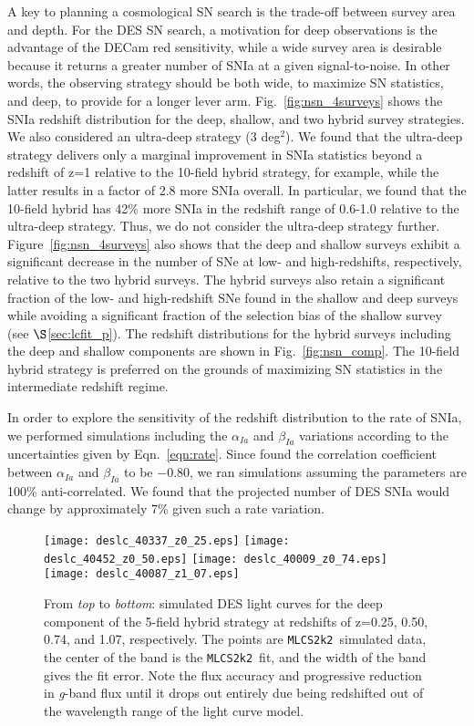 \documentclass[preprint2]{aastex}    %
\newcommand{\mlcs}{{\tt MLCS2k2}}
\begin{document}
A key to %
planning a cosmological SN search is the trade-off between survey area and depth. 
For the DES SN search, a motivation for deep observations is the advantage 
of the DECam red sensitivity, while a wide survey area is desirable because it returns 
a greater number of SNIa at a given signal-to-noise. In other words, %
the
observing strategy should be both wide, to maximize SN statistics, and deep, to
provide for a longer lever arm. Fig.~\ref{fig:nsn_4surveys} shows the SNIa redshift distribution 
for the deep, shallow, and two hybrid survey strategies. We also considered an ultra-deep 
strategy (3 deg$^2$). We found that the ultra-deep strategy delivers only a marginal 
improvement in SNIa statistics beyond a redshift of z=1 relative to the 10-field hybrid strategy, 
for example, while the latter results in a factor of 2.8 more SNIa overall. 
In particular, we found that the 10-field hybrid has 42\% more SNIa in the redshift range of 
0.6-1.0 relative to the ultra-deep strategy. Thus, we do not consider the ultra-deep strategy further. 
Figure~\ref{fig:nsn_4surveys} also shows that the deep and shallow 
surveys exhibit a significant decrease in the number of SNe at low- and 
high-redshifts, respectively, relative to the two hybrid surveys. The hybrid surveys
also retain a significant fraction of the low- and high-redshift SNe found in the 
shallow and deep surveys while avoiding a significant fraction of the selection 
bias of the shallow survey (see $\S$\ref{sec:lcfit_p}). The redshift distributions for the hybrid 
surveys including the deep and shallow components are shown in Fig.~\ref{fig:nsn_comp}. The 
10-field hybrid strategy is preferred on the grounds of maximizing SN statistics in 
the intermediate redshift regime.

In order to explore the sensitivity of the redshift distribution to the rate of 
SNIa, we performed simulations including the $\alpha_{Ia}$ and $\beta_{Ia}$ variations 
according to the uncertainties given by Eqn.~\ref{eqn:rate}.  Since \cite{dil08} 
found the correlation coefficient between $\alpha_{Ia}$ and $\beta_{Ia}$ to be $-$0.80, 
we ran simulations assuming the parameters are 100\% anti-correlated.  We found that 
the projected number of DES SNIa would change by approximately 
7\% given such a rate variation.

\onecolumn
\begin{figure}[ht]
\texttt{[image: deslc\_40337\_z0\_25.eps]}
\texttt{[image: deslc\_40452\_z0\_50.eps]}
\texttt{[image: deslc\_40009\_z0\_74.eps]}
\texttt{[image: deslc\_40087\_z1\_07.eps]}
\caption{From \textit{top} to \textit{bottom}: simulated DES light curves for the deep component of the 5-field hybrid strategy at redshifts of z=0.25, 0.50, 0.74, and 1.07, respectively. The points are \mlcs\ simulated data, the center of the band is the \mlcs\ fit, and the width of the band gives the fit error. Note the flux accuracy and progressive reduction in \textit{g}-band flux until it drops out entirely due being redshifted out of the wavelength range of the light curve model.}
\label{fig:lc}
\end{figure}
\twocolumn
\end{document}
